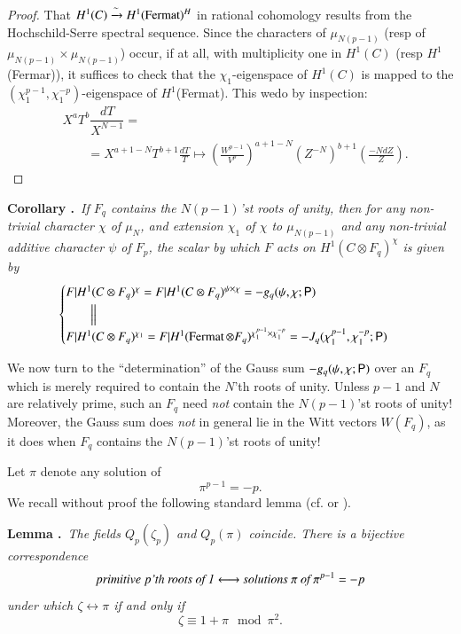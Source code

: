 \begin{proof}
That $H^{1}(C)\xrightarrow{\sim}H^{1}(\operatorname{Fermat})^{H}$ in rational cohomology results from the Hochschild-Serre spectral sequence. Since the characters of $\mu_{N(p-1)}$ (resp of $\mu_{N(p-1)}\times \mu_{N(p-1)}$) occur, if at all, with multiplicity one in $H^{1}(C)$ (resp $H^{1}$ (Fermar)), it suffices to check that the $\chi_{1}$-eigenspace of $H^{1}(C)$ is mapped to the $(\chi^{p-1}_{1},\chi^{-p}_{1})$-eigenspace of $H^{1}$(Fermat). This we\pageoriginale do by inspection:
\begin{align*}
& X^{a}T^{b}\dfrac{dT}{X^{N-1}} =\\[3pt]
& \qquad = X^{a+1-N}T^{b+1}\frac{dT}{T}\mapsto \left(\frac{W^{p-1}}{V^{p}}\right)^{a+1-N}\left(Z^{-N}\right)^{b+1}\left(\frac{-NdZ}{Z}\right).
\end{align*}
\end{proof}

\noindent
{\bf Corollary .\label{art6-coro7.5}}~{\em If $F_{q}$ contains the $N(p-1)$'st roots of unity, then for any non-trivial character $\chi$ of $\mu_{N}$, and extension $\chi_{1}$ of $\chi$ to $\mu_{N(p-1)}$ and any non-trivial additive character $\psi$ of $F_{p}$, the scalar by which $F$ acts on $H^{1}(C\otimes F_{q})^{\chi}$ is given by}
$$
\begin{cases}
F|H^{1}(C\otimes F_{q})^{\chi}=F|H^{1}(C\otimes F_{q})^{\psi\times \chi}=-g_{q}(\psi,\chi;\mathsf{P})\\[3pt]
\qquad \Big|\Big|\\[3pt]
F|H^{1}(C\otimes F_{q})^{\chi_{1}}=F|H^{1}(\operatorname{Fermat}\otimes F_{q})^{\chi^{p-1}_{1}\times \chi^{-p}_{1}}=-J_{q}(\chi^{p-1}_{1},\chi^{-p}_{1};\mathsf{P})
\end{cases}
$$

We now turn to the ``determination'' of the Gauss sum $-g_{q}(\psi,\chi;\mathsf{P})$ over an $F_{q}$ which is merely required to contain the $N$'th roots of unity. Unless $p-1$ and $N$ are relatively prime, such an $F_{q}$ need {\em not} contain the $N(p-1)$'st roots of unity! Moreover, the Gauss sum does {\em not} in general lie in the Witt vectors $W(F_{q})$, as it does when $F_{q}$ contains the $N(p-1)$'st roots of unity!

Let $\pi$ denote any solution of
$$
\pi^{p-1}=-p.
$$
We recall without proof the following standard lemma (cf. \cite{art6-key31} or \cite{art6-key32}).

\medskip
\noindent
{\bf Lemma .\label{art6-lem7.6}}~{\em The fields $Q_{p}(\zeta_{p})$ and $Q_{p}(\pi)$ coincide. There is a bijective correspondence}
$$
\text{\em primitive $p$'th roots of 1} \longleftrightarrow \text{\em solutions $\pi$ of $\pi^{p-1}=-p$}
$$
{\em under which $\zeta\longleftrightarrow \pi$ if and only if}
$$
\zeta\equiv 1+\pi \mod \pi^{2}.
$$

